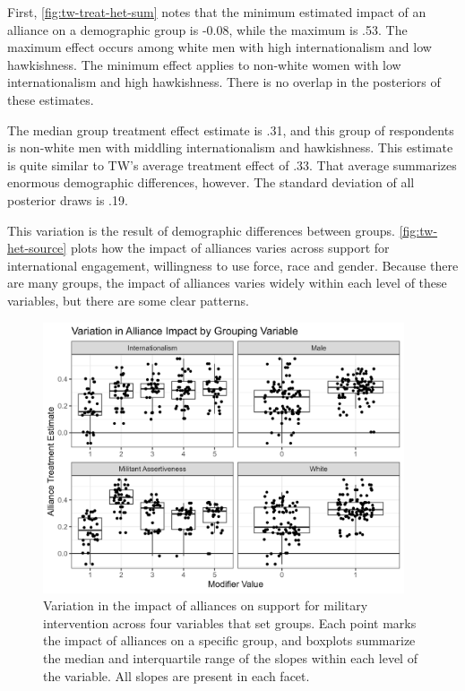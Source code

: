\documentclass[12pt]{article}
\begin{document}
First, \autoref{fig:tw-treat-het-sum} notes that the minimum estimated impact of an alliance on a demographic group is -0.08, while the maximum is .53. 
The maximum effect occurs among white men with high internationalism and low hawkishness.
The minimum effect applies to non-white women with low internationalism and high hawkishness. 
There is no overlap in the posteriors of these estimates. 


The median group treatment effect estimate is .31, and this group of respondents is non-white men with middling internationalism and hawkishness. 
This estimate is quite similar to TW's average treatment effect of .33.
That average summarizes enormous demographic differences, however. 
The standard deviation of all posterior draws is .19.


This variation is the result of demographic differences between groups.
\autoref{fig:tw-het-source} plots how the impact of alliances varies across support for international engagement, willingness to use force, race and gender. 
Because there are many groups, the impact of alliances varies widely within each level of these variables, but there are some clear patterns. 


\begin{figure}[htpb]
	\centering
		\includegraphics[width=0.95\textwidth]{../figures/tw-het-source.png}
	\caption{Variation in the impact of alliances on support for military intervention across four variables that set groups. Each point marks the impact of alliances on a specific group, and boxplots summarize the median and interquartile range of the slopes within each level of the variable. All slopes are present in each facet.}
	\label{fig:tw-het-source}
\end{figure}
\end{document}
